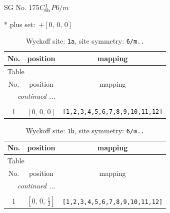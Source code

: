 \documentclass[fleqn,8pt]{jsarticle}
\begin{document}
\setcounter{MaxMatrixCols}{32}

\renewcommand{\tablename}{Table~}
\renewcommand{\figurename}{Figure~}
\begin{center}
\LARGE
SG No. 175\quad$C_{\rm 6h}^{1}$\quad$P6/m$\quad[ hexagonal ]
\end{center}
* plus set:\,\,\,$+\left[ 0,\, 0,\, 0 \right]$
\renewcommand{\arraystretch}{1.2}
\begin{longtable}{ccc}
\caption{Wyckoff site: {\tt 1a}, site symmetry: {\tt 6/m..}}
 \\
 \hline \hline
No. & position & mapping \\ \hline \endfirsthead

\multicolumn{2}{l}{\tablename\ \thetable{}} \\
 \hline \hline
No. & position & mapping \\ \hline \endhead

 \hline \hline
\multicolumn{2}{r}{\footnotesize\it continued ...} \\ \endfoot

 \hline \hline
\multicolumn{2}{r}{} \\ \endlastfoot

1 & $\left[ 0,\, 0,\, 0 \right]$ & {\tt [1,2,3,4,5,6,7,8,9,10,11,12]} \\
\end{longtable}
\renewcommand{\arraystretch}{1.2}
\begin{longtable}{ccc}
\caption{Wyckoff site: {\tt 1b}, site symmetry: {\tt 6/m..}}
 \\
 \hline \hline
No. & position & mapping \\ \hline \endfirsthead

\multicolumn{2}{l}{\tablename\ \thetable{}} \\
 \hline \hline
No. & position & mapping \\ \hline \endhead

 \hline \hline
\multicolumn{2}{r}{\footnotesize\it continued ...} \\ \endfoot

 \hline \hline
\multicolumn{2}{r}{} \\ \endlastfoot

1 & $\left[ 0,\, 0,\, \frac{1}{2} \right]$ & {\tt [1,2,3,4,5,6,7,8,9,10,11,12]} \\
\end{longtable}
\renewcommand{\arraystretch}{1.2}
\end{document}
